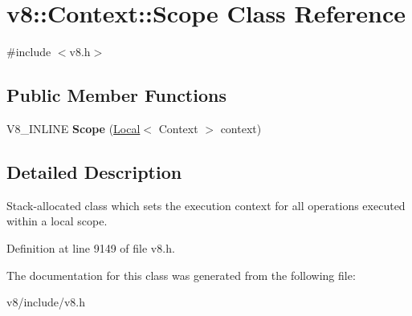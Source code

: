 \hypertarget{classv8_1_1Context_1_1Scope}{}\section{v8\+:\+:Context\+:\+:Scope Class Reference}
\label{classv8_1_1Context_1_1Scope}


{\ttfamily \#include $<$v8.\+h$>$}

\subsection*{Public Member Functions}
\begin{DoxyCompactItemize}
\item 
\mbox{\label{classv8_1_1Context_1_1Scope_a3c7ec79eb92ab9bb2784e4ff0c5557c1}} 
V8\+\_\+\+I\+N\+L\+I\+NE {\bfseries Scope} (\mbox{\hyperlink{classv8_1_1Local}{Local}}$<$ Context $>$ context)
\end{DoxyCompactItemize}


\subsection{Detailed Description}
Stack-\/allocated class which sets the execution context for all operations executed within a local scope. 

Definition at line 9149 of file v8.\+h.



The documentation for this class was generated from the following file\+:\begin{DoxyCompactItemize}
\item 
v8/include/v8.\+h\end{DoxyCompactItemize}
